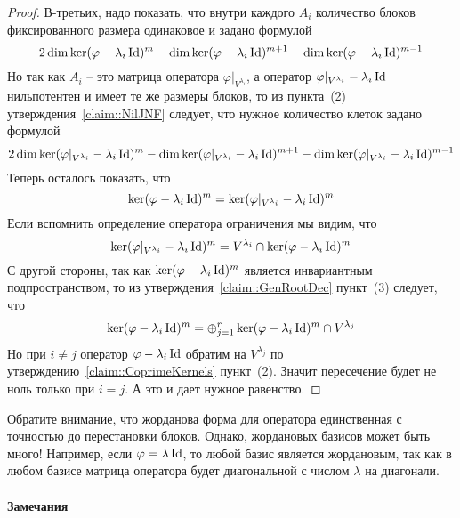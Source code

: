 \begin{proof}
В-третьих, надо показать, что внутри каждого $A_i$ количество блоков фиксированного размера одинаковое  и задано формулой 
\[
2\dim \ker (\varphi - \lambda_i\operatorname{Id})^m - \dim \ker (\varphi - \lambda_i\operatorname{Id})^{m+1} - \dim \ker (\varphi - \lambda_i\operatorname{Id})^{m-1}
\]
Но так как $A_i$ -- это матрица оператора $\varphi|_{V^{\lambda_i}}$, а оператор $\varphi|_{V^{\lambda_i}} - \lambda_i \operatorname{Id}$ нильпотентен и имеет те же размеры блоков, то из пункта~(2) утверждения~\ref{claim::NilJNF} следует, что нужное количество клеток задано формулой
\[
2\dim \ker (\varphi|_{V^{\lambda_i}} - \lambda_i\operatorname{Id})^m - \dim \ker (\varphi|_{V^{\lambda_i}} - \lambda_i\operatorname{Id})^{m+1} - \dim \ker (\varphi|_{V^{\lambda_i}} - \lambda_i\operatorname{Id})^{m-1}
\]
Теперь осталось показать, что 
\[
\ker (\varphi - \lambda_i\operatorname{Id})^m = \ker (\varphi|_{V^{\lambda_i}} - \lambda_i\operatorname{Id})^m
\]
Если вспомнить определение оператора ограничения мы видим, что
\[
\ker (\varphi|_{V^{\lambda_i}} - \lambda_i\operatorname{Id})^m = V^{\lambda_i}\cap \ker (\varphi - \lambda_i\operatorname{Id})^m
\]
С другой стороны, так как $\ker (\varphi - \lambda_i\operatorname{Id})^m$ является инвариантным подпространством, то из утверждения~\ref{claim::GenRootDec} пункт~(3) следует, что
\[
\ker (\varphi - \lambda_i\operatorname{Id})^m = \oplus_{j=1}^r \ker (\varphi - \lambda_i\operatorname{Id})^m \cap V^{\lambda_j}
\]
Но при $i\neq j$ оператор $\varphi - \lambda_i \operatorname{Id}$ обратим на $V^{\lambda_j}$ по утверждению~\ref{claim::CoprimeKernels} пункт~(2). Значит пересечение будет не ноль только при $i = j$. А это и дает нужное равенство.
\end{proof}



Обратите внимание, что жорданова форма для оператора единственная с точностью до перестановки блоков. Однако, жордановых базисов может быть много! Например, если $\varphi = \lambda \operatorname{Id}$, то любой базис является жордановым, так как в любом базисе матрица оператора будет диагональной с числом $\lambda$ на диагонали.


\paragraph{Замечания}


